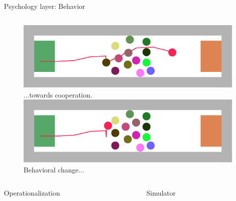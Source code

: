 \documentclass[compress,t,usenames,xcolor=dvipsnames]{beamer}
\newcommand{\twocolcaption}{
    \vspace{\baselineskip}
    \begin{columns}
        \begin{column}{0.5\linewidth}
            \centering
            Operationalization
        \end{column}
        \begin{column}{0.5\linewidth}
            \centering
            Simulator
        \end{column}
    \end{columns}
}
\begin{document}
\begin{frame}[c]{Psychology layer: Behavior}
\begin{columns}
        \begin{column}[c]{0.5\linewidth}
            \begin{figure}
                \centering
                \includegraphics[width=\linewidth]{VaderePsychologyLayer/DisabledVsEnabled/CooperativeCognitionModel-PsychEnabled}
                \newline
                {\footnotesize ...towards cooperation.}
                \includegraphics[width=\linewidth]{VaderePsychologyLayer/DisabledVsEnabled/CooperativeCognitionModel-PsychDisabled}
                \newline
                {\footnotesize Behavioral change...}
            \end{figure}
        \end{column}
    \end{columns}
    \twocolcaption{}
    
    
\end{frame}
\end{document}
